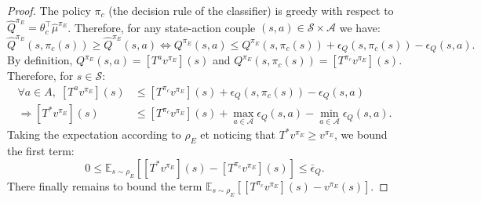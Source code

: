 \documentclass[english,utf8]{./hermes-journal}
\newcommand{\s}{\mathcal{S}}
\newcommand{\A}{\mathcal{A}}
\newcommand{\E}{\mathbb{E}}
\begin{document}
\begin{proof}
  The policy $\pi_c$ (the decision rule of the classifier) is greedy
  with respect to
  $\hat{Q}^{\pi_E}=\theta_c^\top\hat{\mu}^{\pi_E}$. Therefore, for any state-action couple
  $(s,a)\in\s\times \A$ we have:
  \begin{equation}
    \hat{Q}^{\pi_E}(s,\pi_c(s))\geq
    \hat{Q}^{\pi_E}(s,a)
    \Leftrightarrow
    Q^{\pi_E}(s,a) \leq Q^{\pi_E}(s,\pi_c(s)) +
    \epsilon_Q(s,\pi_c(s)) - \epsilon_Q(s,a).
  \end{equation}
  By definition, $Q^{\pi_E}(s,a) = [T^a v^{\pi_E}](s)$ and
  $Q^{\pi_E}(s,\pi_c(s)) = [T^{\pi_c} v^{\pi_E}](s)$. Therefore, for $s\in\s$:
  \begin{align}
    \forall a\in A,\; [T^a v^{\pi_E}](s) &\leq [T^{\pi_c}
    v^{\pi_E}](s) + \epsilon_Q(s,\pi_c(s))-\epsilon_Q(s,a)
    \\
    \Rightarrow [T^* v^{\pi_E}](s) &\leq [T^{\pi_c}
    v^{\pi_E}](s) + \max_{a\in \A}\epsilon_Q(s,a)-\min_{a\in
    \A}\epsilon_Q(s,a).
  \end{align}
  Taking the expectation according to $\rho_E$ et noticing that
  $T^* v^{\pi_E}\geq v^{\pi_E}$, we bound the first
  term:
  \begin{equation}
    0 \leq \E_{s\sim\rho_E}\left[ [T^* v^{\pi_E}](s) - [T^{\pi_c}
    v^{\pi_E}](s)\right] \leq \bar{\epsilon}_Q.
    \label{eq:proof:b1}
  \end{equation}
  There finally remains to bound the term $\E_{s\sim\rho_E}[[T^{\pi_c}v^{\pi_E}](s) -
  v^{\pi_E}(s)]$.


\end{proof}
\end{document}
